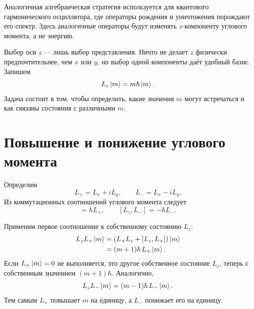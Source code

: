 Аналогичная алгебраическая стратегия используется для квантового гармонического осциллятора, где операторы рождения и уничтожения порождают его спектр. Здесь аналогичные операторы будут изменять \(z\)-компоненту углового момента, а не энергию.

Выбор оси \(z\) — лишь выбор представления. Ничто не делает \(z\) физически предпочтительнее, чем \(x\) или \(y\), но выбор одной компоненты даёт удобный базис. Запишем
\begin{equation}
L_z\left\lvert m\right\rangle=m\hbar\left\lvert m\right\rangle.
\end{equation}
Задача состоит в том, чтобы определить, какие значения \(m\) могут встречаться и как связаны состояния с различными \(m\).

\begin{classroomqa}
\end{classroomqa}

\section{Повышение и понижение углового момента}

Определим
\begin{equation}
L_+=L_x+iL_y,
\qquad
L_-=L_x-iL_y.
\end{equation}
Из коммутационных соотношений углового момента следует
\begin{equation}
[L_z,L_+]=\hbar L_+,
\qquad
[L_z,L_-]=-\hbar L_-.
\end{equation}

Применим первое соотношение к собственному состоянию \(L_z\):
\begin{align}
L_zL_+\left\lvert m\right\rangle
&=\left(L_+L_z+[L_z,L_+]\right)\left\lvert m\right\rangle\\
&=(m+1)\hbar\,L_+\left\lvert m\right\rangle.
\end{align}
Если \(L_+\left\lvert m\right\rangle=0\) не выполняется, это другое собственное состояние \(L_z\), теперь с собственным значением \((m+1)\hbar\). Аналогично,
\begin{equation}
L_zL_-\left\lvert m\right\rangle
=(m-1)\hbar\,L_-\left\lvert m\right\rangle.
\end{equation}
Тем самым \(L_+\) повышает \(m\) на единицу, а \(L_-\) понижает его на единицу.

